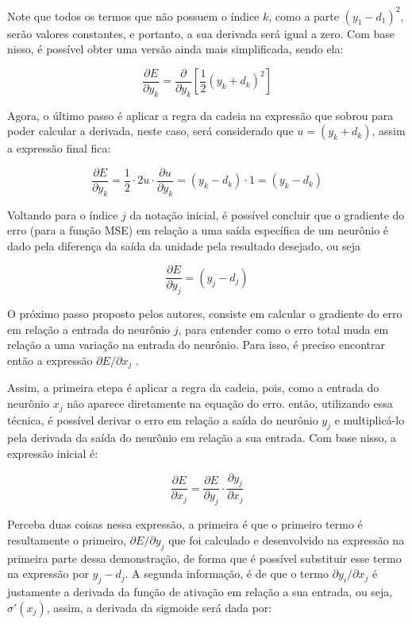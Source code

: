 Note que todos os termos que não possuem o índice $k$, como a parte $(y_1 - d_1)^2$, serão valores constantes, e portanto, a sua derivada será igual a zero. Com base nisso, é possível obter uma versão ainda mais simplificada, sendo ela:

\[
    \frac{\partial E}{\partial y_k} = \frac{\partial}{\partial y_k} \left[ \frac{1}{2} (y_k + d_k)^2 \right]
\]

Agora, o último passo é aplicar a regra da cadeia na expressão que sobrou para poder calcular a derivada, neste caso, será considerado que $u = (y_k + d_k)$, assim a expressão final fica:

\[
    \frac{\partial E}{\partial y_k} = \frac{1}{2} \cdot 2u \cdot \frac{\partial u}{\partial y_k} = (y_k - d_k) \cdot 1 = (y_k - d_k)
\]

Voltando para o índice $j$ da notação inicial, é possível concluir que o gradiente do erro (para a função MSE) em relação a uma saída específica de um neurônio é dado pela diferença da saída da unidade pela resultado desejado, ou seja

\[
    \frac{\partial E}{\partial y_j} = (y_j - d_j) 
\]

O próximo passo proposto pelos autores, consiste em calcular o gradiente do erro em relação a entrada do neurônio $j$, para entender como o erro total muda em relação a uma variação na entrada do neurônio. Para isso, é preciso encontrar então a expressão $\partial E / \partial x_j$ \parencite{BackpropagationArticle}.

Assim, a primeira etepa é aplicar a regra da cadeia, pois, como a entrada do neurônio $x_j$ não aparece diretamente na equação do erro. então, utilizando essa técnica, é possível derivar o erro em relação a saída do neurônio $y_j$ e multiplicá-lo pela derivada da saída do neurônio em relação a sua entrada. Com base nisso, a expressão inicial é:

\[
    \frac{\partial E}{\partial x_j} = \frac{\partial E}{\partial y_j} \cdot \frac{\partial y_j}{\partial x_j}
\]

Perceba duas coisas nessa expressão, a primeira é que o primeiro termo é resultamente o primeiro, $\partial E / \partial y_j$ que foi calculado e desenvolvido na expressão na primeira parte dessa demonstração, de forma que é possível substituir esse termo na expressão por $y_j - d_j$. A segunda informação, é de que o termo $\partial y_i / \partial x_j$ é justamente a derivada da função de ativação em relação a sua entrada, ou seja, $\sigma'(x_j)$, assim, a derivada da sigmoide será dada por:

